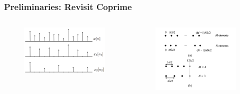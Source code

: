 \documentclass{beamer}
\begin{document}
\begin{frame}
\frametitle{Preliminaries: Revisit Coprime}
\begin{columns}[c] %

\begin{figure}
\includegraphics[width=1\linewidth]{illustrate.pdf}
\end{figure}

\begin{figure}
\includegraphics[width=1\linewidth]{coprime_sampling.pdf}
\end{figure}

\end{columns}
\end{frame}
\end{document}

